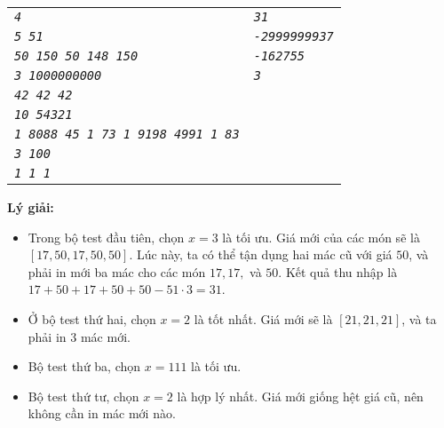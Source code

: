 \begin{ex}
\begin{center}
\begin{tabular}{|l|l|}
			\hline
			\textit{\texttt{4}}                               & \textit{\texttt{31}}                \\ %
			\textit{\texttt{5 51}}                            & \textit{\texttt{-2999999937}}       \\
			\textit{\texttt{50 150 50 148 150}}               & \textit{\texttt{-162755}}           \\
			\textit{\texttt{3 1000000000}}                    & \textit{\texttt{3}}                 \\
			\textit{\texttt{42 42 42}}                        &                                     \\
			\textit{\texttt{10 54321}}                        &                                     \\
			\textit{\texttt{1 8088 45 1 73 1 9198 4991 1 83}} &                                     \\
			\textit{\texttt{3 100}}                           &                                     \\
			\textit{\texttt{1 1 1}}                           &                                     \\
			\hline
		\end{tabular}

	\end{center}

	\textbf{Lý giải: }
	\begin{itemize}
		\item Trong bộ test đầu tiên, chọn $x = 3$ là tối ưu. Giá mới của các món sẽ là $[17,50,17,50,50]$. Lúc này, ta có thể tận dụng hai mác cũ với giá $50$, và phải in mới ba mác cho các món $17, 17, $ và $50$. Kết quả thu nhập là $17 + 50 + 17 + 50 + 50 - 51 \cdot 3 = 31$.
		\item Ở bộ test thứ hai, chọn $x=2$ là tốt nhất. Giá mới sẽ là $[21,21,21]$, và ta phải in $3$ mác mới.
		\item Bộ test thứ ba, chọn $x=111$ là tối ưu.
		\item Bộ test thứ tư, chọn $x=2$ là hợp lý nhất. Giá mới giống hệt giá cũ, nên không cần in mác mới nào.
	\end{itemize}
\end{ex}


